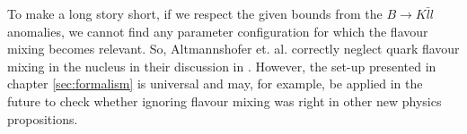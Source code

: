 \clearpage
To make a long story short, if we respect the given bounds from the $B\rightarrow K\bar{l}l$ anomalies, we cannot find any parameter configuration for which the flavour mixing becomes relevant. So, Altmannshofer et. al. correctly neglect quark flavour mixing in the nucleus in their discussion in \cite{Z}. However, the set-up presented in chapter \ref{sec:formalism} is universal and may, for example, be applied in the future to check whether ignoring flavour mixing was right in other new physics propositions.